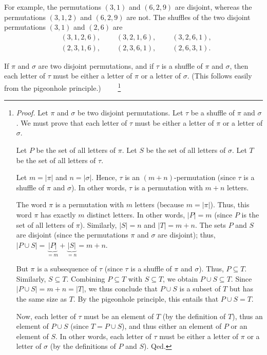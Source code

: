 \documentclass[numbers=enddot,12pt,final,onecolumn,notitlepage]{scrartcl}%
\theoremstyle{definition}
\newenvironment{verlong}{}{}
\newenvironment{vershort}{}{}
\begin{document}
For example, the permutations $\left(  3,1\right)  $ and $\left(
6,2,9\right)  $ are disjoint, whereas the permutations $\left(  3,1,2\right)
$ and $\left(  6,2,9\right)  $ are not. The shuffles of the two disjoint
permutations $\left(  3,1\right)  $ and $\left(  2,6\right)  $ are%
\begin{align*}
&  \left(  3,1,2,6\right)  ,\ \ \ \ \ \ \ \ \ \ \left(  3,2,1,6\right)
,\ \ \ \ \ \ \ \ \ \ \left(  3,2,6,1\right)  ,\\
&  \left(  2,3,1,6\right)  ,\ \ \ \ \ \ \ \ \ \ \left(  2,3,6,1\right)
,\ \ \ \ \ \ \ \ \ \ \left(  2,6,3,1\right)  .
\end{align*}

If $\pi$ and $\sigma$ are two disjoint permutations, and if $\tau$ is a shuffle
of $\pi$ and $\sigma$, then each letter of $\tau$ must be either a letter of
$\pi$ or a letter of $\sigma$.
\begin{vershort}
 (This follows easily from the pigeonhole principle.)
\end{vershort}
\begin{verlong}
\ \ \ \ \footnote{\textit{Proof.} Let $\pi$ and $\sigma$ be two disjoint
permutations.
Let $\tau$ be a shuffle of $\pi$ and $\sigma$.
We must prove that each letter of $\tau$ must be either a letter of
$\pi$ or a letter of $\sigma$.

Let $P$ be the set of all letters of $\pi$.
Let $S$ be the set of all letters of $\sigma$.
Let $T$ be the set of all letters of $\tau$.

Let $m = \left|\pi\right|$ and $n = \left|\sigma\right|$.
Hence, $\tau$ is an $\left(m+n\right)$-permutation (since $\tau$
is a shuffle of $\pi$ and $\sigma$).
In other words, $\tau$ is a permutation with $m+n$ letters.

The word $\pi$ is a permutation with $m$ letters (because
$m = \left|\pi\right|$). Thus, this word $\pi$ has exactly $m$
distinct letters. In other words, $\left|P\right| = m$
(since $P$ is the set of all letters of $\pi$).
Similarly, $\left|S\right| = n$ and $\left|T\right| = m+n$.
The sets $P$ and $S$ are disjoint (since the permutations $\pi$
and $\sigma$ are disjoint); thus,
$\left|P \cup S\right| = \underbrace{\left|P\right|}_{=m}
                       + \underbrace{\left|S\right|}_{=n}
= m+n$.

But $\pi$ is a subsequence of $\tau$ (since $\tau$
is a shuffle of $\pi$ and $\sigma$). Thus, $P \subseteq T$.
Similarly, $S \subseteq T$.
Combining $P \subseteq T$ with $S \subseteq T$, we obtain
$P \cup S \subseteq T$. Since
$\left|P \cup S\right| = m+n = \left|T\right|$, we thus conclude
that $P \cup S$ is a subset of $T$ but has the same size as $T$.
By the pigeonhole principle, this entails that $P \cup S = T$.

Now, each letter of $\tau$ must be an element of $T$ (by the definition
of $T$), thus an element of $P \cup S$ (since $T = P \cup S$), and thus
either an element of $P$ or an element of $S$. In other words, each
letter of $\tau$ must be either a letter of $\pi$ or a letter of $\sigma$
(by the definitions of $P$ and $S$). Qed.
}
\end{verlong}
\end{document}
